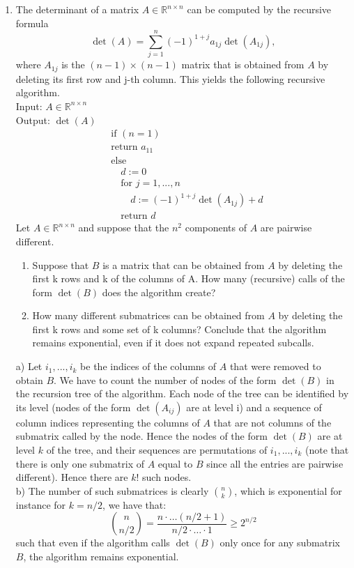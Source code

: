 \documentclass[11pt]{article}
\newcommand{\setR}{\mathbb{R}}
\renewcommand{\geq}{\geqslant}
\begin{document}
\begin{enumerate}[1)]
\item The determinant of a matrix $A∈\setR^{n×n}$ can be computed by the recursive formula
$$\det(A) = \displaystyle\sum_{j=1}^n (-1)^{1+j} a_{1j}\det(A_{1j}), $$
where $A_{1j}$ is the $(n−1)\times(n−1)$ matrix that is obtained from $A$ by deleting its first row and j-th
column. This yields the following recursive algorithm.\\
Input: $A∈\setR^{n×n}$ \\
Output: $\det(A)$\\
\begin{align*}
& \text{if } (n= 1) \\
&\text{return }a_{11}\\
&\text{else} \\
& \quad d:= 0\\
& \quad\text{for }j = 1,...,n\\
& \quad \quad d:= (−1)^{1+j} \det(A_{1j} ) + d \\
&\quad \text{return }d
\end{align*}
Let $A∈\setR^{n×n}$ and suppose that the $n^2$ components of $A$ are pairwise diﬀerent.
\begin{enumerate}
\item Suppose that $B$ is a matrix that can be obtained from $A$ by deleting the first k rows and k of
the columns of A. How many (recursive) calls of the form $\det(B)$ does the algorithm create?
\item How many diﬀerent submatrices can be obtained from $A$ by deleting the first k rows and some
set of k columns? Conclude that the algorithm remains exponential, even if it does not expand
repeated subcalls.
\end{enumerate}

\begin{solution}
a) Let $i_1,...,i_k$ be the indices of the columns of $A$ that were removed to obtain $B$. We have to
count the number of nodes of the form $\det(B)$ in the recursion tree of the algorithm. Each node
of the tree can be identified by its level (nodes of the form $\det(A_{ij})$ are at level i) and a sequence
of column indices representing the columns of $A$ that are not columns of the submatrix called
by the node. Hence the nodes of the form $\det(B)$ are at level $k$ of the tree, and their sequences
are permutations of $i_1,...,i_k$ (note that there is only one submatrix of $A$ equal to $B$ since all
the entries are pairwise diﬀerent). Hence there are $k!$ such nodes. \\
b) The number of such submatrices is clearly $\binom{n}{k}$, which is exponential for instance for $k= n/2$, we have that:
$$\binom{n}{n/2} = \frac{n \cdot \hdots (n/2 + 1)}{n/2 \cdot \hdots \cdot 1} \geq 2^{n/2}$$
such that even if the algorithm calls $\det(B)$ only once for any submatrix $B$, the algorithm remains exponential.
\end{solution}

\end{enumerate}



  
\end{document}
